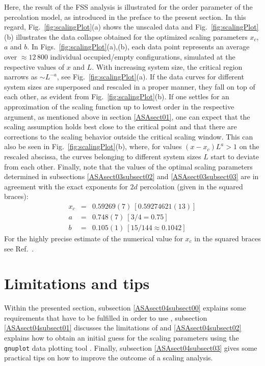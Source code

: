 Here, the result of the FSS analysis is illustrated for
the order parameter of the percolation model, as introduced in the preface to the present section.
In this regard, Fig.\ \ref{fig:scalingPlot}(a) shows the unscaled data and Fig.\ \ref{fig:scalingPlot}(b)
illustrates the data collapse obtained for the optimized scaling parameters $x_c$, $a$ and $b$. 
In Figs.\ \ref{fig:scalingPlot}(a),(b), each data point represents an average over $\approx\!12\,800$
individual occupied/empty configurations, simulated at the respective values of $x$ and $L$.
With increasing system size, the critical region narrows as $\sim\!L^{-a}$, see Fig.\ \ref{fig:scalingPlot}(a). 
If the data curves for different system sizes are superposed and rescaled in a proper 
manner, they fall on top of each other, as evident from Fig.\ \ref{fig:scalingPlot}(b).
If one settles for an approximation of the scaling function up to lowest order in 
the respective argument, as mentioned above in section \ref{ASAsect01}, 
one can expect that the scaling assumption holds best close to the critical point and 
that there are corrections to the scaling behavior outside the critical scaling window. 
This can also be seen in Fig.\ \ref{fig:scalingPlot}(b),
where, for values $(x-x_c)L^{a} > 1$ on the rescaled abscissa, the 
curves belonging to different system sizes $L$ start to deviate from each other.
Finally, note that the values of the optimal scaling parameters determined in 
subsections \ref{ASAsect03subsect02} and \ref{ASAsect03subsect03} are in agreement with the
exact exponents for $2d$ percolation (given in the squared braces):
\begin{eqnarray*}
x_c&=&0.59269(7)~[0.59274621(13)] \\
a&=&0.748(7)~[3/4=0.75]\\
b&=&0.105(1)~[15/144\approx0.1042]
\end{eqnarray*}
For the highly precise estimate of the numerical value for $x_c$ in the squared braces see Ref.\ \cite{ASAnewman2000}.

\section{Limitations and tips}
\label{ASAsect04}
Within the presented section, 
subsection \ref{ASAsect04subsect00} explains some requirements that have
to be fulfilled in order to use \myProg{},
subsection \ref{ASAsect04subsect01} discusses the limitations of \myProg{}
and \ref{ASAsect04subsect02} explains how to obtain an initial guess for 
the scaling parameters using the {\tt gnuplot} data plotting tool \cite{ASAgnuplotRef}.
Finally, subsection \ref{ASAsect04subsect03} gives some practical tips on how to 
improve the outcome of a scaling analysis.

